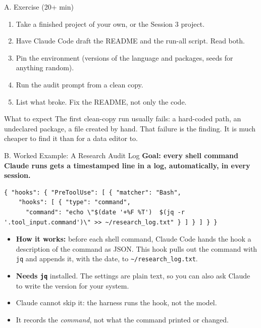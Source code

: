 \documentclass[aspectratio=169, 11pt]{beamer}
\begin{document}
\begin{frame}{A. Exercise (20+ min)}
  \begin{enumerate}
    \item Take a finished project of your own, or the Session 3 project.
    \item Have Claude Code draft the README and the run-all script. Read both.
    \item Pin the environment (versions of the language and packages, seeds for anything random).
    \item Run the audit prompt from a clean copy.
    \item List what broke. Fix the README, not only the code.
  \end{enumerate}

  \vspace{0.6em}
  \begin{block}{What to expect}
    The first clean-copy run usually fails: a hard-coded path, an undeclared package, a file created by hand. That failure is the finding. It is much cheaper to find it than for a data editor to.
  \end{block}
  \vfill
  \hyperlink{backmatter}{}
\end{frame}


\begin{frame}[fragile,label=hooksx]{B. Worked Example: A Research Audit Log}
  \textbf{Goal: every shell command Claude runs gets a timestamped line in a log, automatically, in every session.}

  \vspace{0.3em}
  \begin{lstlisting}[basicstyle=\ttfamily\tiny]
{ "hooks": { "PreToolUse": [ { "matcher": "Bash",
    "hooks": [ { "type": "command",
      "command": "echo \"$(date '+%F %T')  $(jq -r '.tool_input.command')\" >> ~/research_log.txt" } ] } ] } }
  \end{lstlisting}

  \vspace{0.2em}
  \begin{itemize}\small
    \item \textbf{How it works:} before each shell command, Claude Code hands the hook a description of the command as JSON. This hook pulls out the command with \texttt{jq} and appends it, with the date, to \texttt{\textasciitilde/research\_log.txt}.
    \item \textbf{Needs \texttt{jq}} installed. The settings are plain text, so you can also ask Claude to write the version for your system.
    \item Claude cannot skip it: the harness runs the hook, not the model.
    \item It records the \emph{command}, not what the command printed or changed.
  \end{itemize}
\end{frame}
\end{document}
